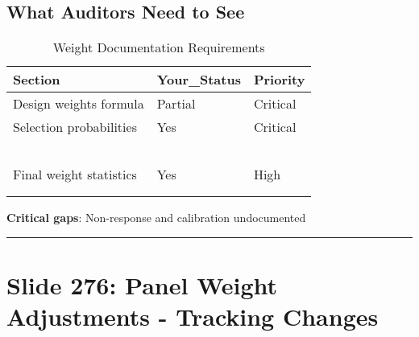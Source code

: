 \documentclass[
]{article}
\begin{document}
\subsection{What Auditors Need to See}\label{what-auditors-need-to-see}

\begin{longtable}[t]{lll}
\caption{\label{tab:weight-documentation}Weight Documentation Requirements}\\
\toprule
Section & Your\_Status & Priority\\
\midrule
Design weights formula & Partial & Critical\\
Selection probabilities & Yes & Critical\\
\cellcolor[HTML]{ffcccc}{Non-response method} & \cellcolor[HTML]{ffcccc}{No} & \cellcolor[HTML]{ffcccc}{High}\\
\cellcolor[HTML]{ffcccc}{Response rates by class} & \cellcolor[HTML]{ffcccc}{No} & \cellcolor[HTML]{ffcccc}{High}\\
\cellcolor[HTML]{ffcccc}{Calibration variables} & \cellcolor[HTML]{ffcccc}{No} & \cellcolor[HTML]{ffcccc}{High}\\
\addlinespace
\cellcolor[HTML]{ffcccc}{Population totals source} & \cellcolor[HTML]{ffcccc}{No} & \cellcolor[HTML]{ffcccc}{Medium}\\
\cellcolor[HTML]{ffcccc}{Trimming method} & \cellcolor[HTML]{ffcccc}{No} & \cellcolor[HTML]{ffcccc}{Medium}\\
Final weight statistics & Yes & High\\
\cellcolor[HTML]{ffcccc}{Quality diagnostics} & \cellcolor[HTML]{ffcccc}{No} & \cellcolor[HTML]{ffcccc}{High}\\
\cellcolor[HTML]{ffcccc}{Software and code} & \cellcolor[HTML]{ffcccc}{No} & \cellcolor[HTML]{ffcccc}{Medium}\\
\bottomrule
\end{longtable}

\textbf{Critical gaps}: Non-response and calibration undocumented

\begin{center}\rule{0.5\linewidth}{0.5pt}\end{center}

\section{Slide 276: Panel Weight Adjustments - Tracking
Changes}\label{slide-276-panel-weight-adjustments---tracking-changes}
\end{document}
